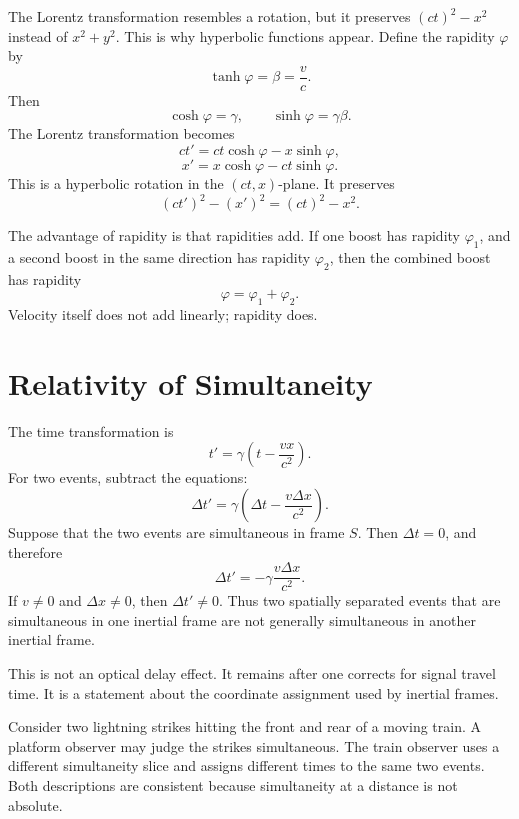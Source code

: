 The Lorentz transformation resembles a rotation, but it preserves
\((ct)^2-x^2\) instead of \(x^2+y^2\).  This is why hyperbolic functions appear.
Define the rapidity \(\varphi\) by
\[
\tanh\varphi=\beta=\frac{v}{c}.
\]
Then
\[
\cosh\varphi=\gamma,
\qquad
\sinh\varphi=\gamma\beta.
\]
The Lorentz transformation becomes
\[
ct'=ct\cosh\varphi-x\sinh\varphi,
\]
\[
x'=x\cosh\varphi-ct\sinh\varphi.
\]
This is a hyperbolic rotation in the \((ct,x)\)-plane.  It preserves
\[
(ct')^2-(x')^2=(ct)^2-x^2.
\]

The advantage of rapidity is that rapidities add.  If one boost has rapidity
\(\varphi_1\), and a second boost in the same direction has rapidity
\(\varphi_2\), then the combined boost has rapidity
\[
\varphi=\varphi_1+\varphi_2.
\]
Velocity itself does not add linearly; rapidity does.

\begin{center}
\end{center}

\clearpage

\section{Relativity of Simultaneity}

The time transformation is
\[
t'=\gamma\left(t-\frac{vx}{c^2}\right).
\]
For two events, subtract the equations:
\[
\Delta t'=\gamma\left(\Delta t-\frac{v\Delta x}{c^2}\right).
\]
Suppose that the two events are simultaneous in frame \(S\).  Then
\(\Delta t=0\), and therefore
\[
\Delta t'=-\gamma\frac{v\Delta x}{c^2}.
\]
If \(v\neq0\) and \(\Delta x\neq0\), then \(\Delta t'\neq0\).  Thus two
spatially separated events that are simultaneous in one inertial frame are not
generally simultaneous in another inertial frame.

This is not an optical delay effect.  It remains after one corrects for signal
travel time.  It is a statement about the coordinate assignment used by inertial
frames.

\begin{examplebox}
Consider two lightning strikes hitting the front and rear of a moving train.  A
platform observer may judge the strikes simultaneous.  The train observer uses a
different simultaneity slice and assigns different times to the same two events.
Both descriptions are consistent because simultaneity at a distance is not
absolute.
\end{examplebox}

